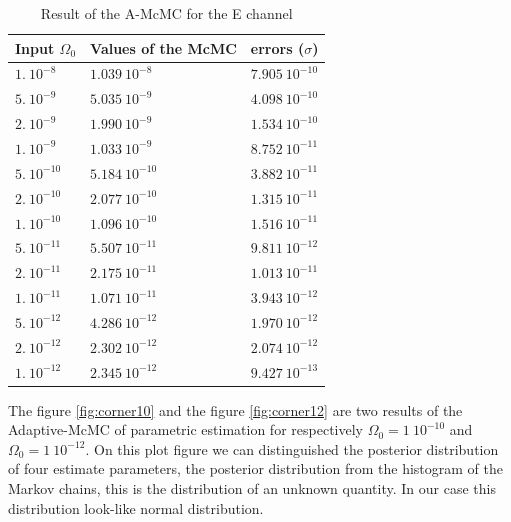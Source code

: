 \documentclass[a4paper,12pt]{article}
\begin{document}
\begin{table}[H]
\begin{center}
\begin{tabular}{|l|l|l|}
\hline
Input $\Omega_0$    & Values of the McMC    & errors ($\sigma$)   \\ \hline
$1. \ 10^{-8}$      & $1.039 \ 10^{-8}$     & $7.905 \ 10^{-10}$  \\ \hline
$5. \ 10^{-9}$      & $5.035 \ 10^{-9}$     & $4.098 \ 10^{-10}$  \\ \hline
$2. \ 10^{-9}$      & $1.990 \ 10^{-9}$     & $1.534 \ 10^{-10}$  \\ \hline
$1. \ 10^{-9}$      & $1.033 \ 10^{-9}$     & $8.752 \ 10^{-11}$  \\ \hline
$5. \ 10^{-10}$     & $5.184 \ 10^{-10}$    & $3.882 \ 10^{-11}$  \\ \hline
$2. \ 10^{-10}$     & $2.077 \ 10^{-10}$    & $1.315 \ 10^{-11}$  \\ \hline
$1. \ 10^{-10}$     & $1.096 \ 10^{-10}$    & $1.516 \ 10^{-11}$  \\ \hline
$5. \ 10^{-11}$     & $5.507 \ 10^{-11}$    & $9.811 \ 10^{-12}$  \\ \hline
$2. \ 10^{-11}$     & $2.175 \ 10^{-11}$    & $1.013 \ 10^{-11}$  \\ \hline
$1. \ 10^{-11}$     & $1.071 \ 10^{-11}$    & $3.943 \ 10^{-12}$  \\ \hline
$5. \ 10^{-12}$     & $4.286 \ 10^{-12}$    & $1.970 \ 10^{-12}$  \\ \hline
$2. \ 10^{-12}$     & $2.302 \ 10^{-12}$    & $2.074 \ 10^{-12}$  \\ \hline
$1. \ 10^{-12}$     & $2.345 \ 10^{-12}$    & $9.427 \ 10^{-13}$  \\ \hline
\end{tabular}
\end{center}
\caption{Result of the A-McMC for the E channel}
\label{table:resultE}
\end{table}

The figure \ref{fig:corner10} and the figure \ref{fig:corner12} are two results of the Adaptive-McMC of parametric estimation for respectively $ \Omega_0 = 1 \ 10^{-10} $ and $\Omega_0 = 1 \ 10^{-12}$. On this plot figure we can distinguished the posterior distribution of four estimate parameters, the posterior distribution from the histogram of the Markov chains, this is the distribution of an unknown quantity. In our case this distribution look-like normal distribution. 
\end{document}
